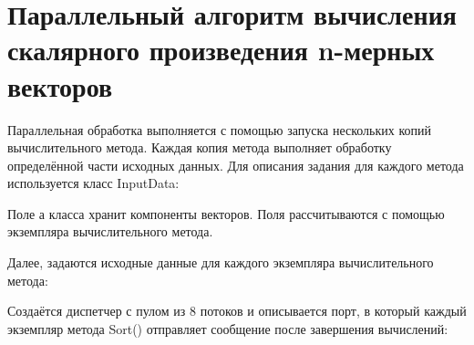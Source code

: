 \clearpage

\section{Параллельный алгоритм вычисления скалярного произведения n-мерных векторов}

Параллельная обработка выполняется с помощью запуска нескольких
копий вычислительного метода. Каждая копия метода выполняет
обработку определённой части исходных данных. Для описания задания
для каждого метода используется класс InputData:

Поле а класса хранит компоненты векторов. Поля рассчитываются с помощью экземпляра вычислительного
метода.

\begin{figure}[h!]
\end{figure}

Далее, задаются исходные данные для каждого экземпляра
вычислительного метода:

\begin{figure}[h!]
\end{figure}

Создаётся диспетчер с пулом из 8 потоков и описывается порт, в который каждый экземпляр метода Sort() отправляет сообщение после завершения вычислений:

\begin{figure}[h!]
\end{figure}


